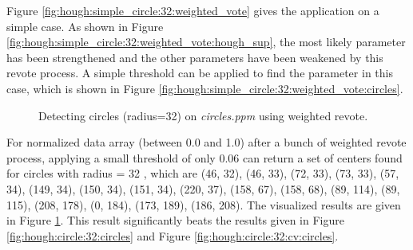 \documentclass[paper=a4, fontsize=11pt]{scrartcl}
\begin{document}
Figure \ref{fig:hough:simple_circle:32:weighted_vote} gives the application on a simple case. 
As shown in Figure \ref{fig:hough:simple_circle:32:weighted_vote:hough_sup}, the most likely parameter has been strengthened and the other parameters have been weakened by this revote process.
A simple threshold can be applied to find the parameter in this case, which is shown in Figure \ref{fig:hough:simple_circle:32:weighted_vote:circles}.

\begin{figure}[h]
\centering
{}
\caption{Detecting circles (radius=32) on \emph{circles.ppm} using weighted revote.}
\label{fig:hough:circle:32:weighted_vote}
\end{figure}

For normalized data array (between 0.0 and 1.0) after a bunch of weighted revote process, applying a small threshold of only $ 0.06 $ can return a set of centers found for circles with radius = 32 , which are (46, 32), (46, 33), (72, 33), (73, 33), (57, 34), (149, 34), (150, 34), (151, 34), (220, 37), (158, 67), (158, 68), (89, 114), (89, 115), (208, 178), (0, 184), (173, 189), (186, 208).
The visualized results are given in Figure \ref{fig:hough:circle:32:weighted_vote}.
This result significantly beats the results given in Figure \ref{fig:hough:circle:32:circles} and Figure \ref{fig:hough:circle:32:cv:circles}.
\end{document}
